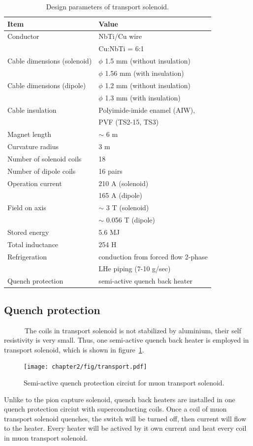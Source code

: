 \begin{table}[H]
 \centering
 \begin{tabular}{ll} \hline \hline
  Item & Value \\ \hline
  Conductor & NbTi/Cu wire \\
   & Cu:NbTi = 6:1 \\
  Cable dimensions (solenoid) & $\phi$ 1.5 mm (without insulation) \\
   & $\phi$ 1.56 mm (with insulation) \\
  Cable dimensions (dipole) & $\phi$ 1.2 mm (without insulation) \\
   & $\phi$ 1.3 mm (with insulation) \\
  Cable insulation & Polyimide-imide enamel (AIW), \\
   & PVF (TS2-15, TS3) \\
  Magnet length & $\sim$ 6 m \\
  Curvature radius & 3 m \\
  Number of solenoid coils & 18 \\
  Number of dipole coils & 16 pairs \\
  Operation current & 210 A (solenoid) \\
   & 165 A (dipole) \\
  Field on axis & $\sim$ 3 T (solenoid) \\
   & $\sim$ 0.056 T (dipole) \\
  Stored energy & 5.6 MJ \\
  Total inductance & 254 H \\
  Refrigeration & conduction from forced flow 2-phase \\
   & LHe piping (7-10 g/sec) \\
  Quench protection & semi-active quench back heater \\ \hline \hline
 \end{tabular}
 \caption{Design parameters of transport solenoid.}
 \label{designts}
\end{table}

\subsection{Quench protection}
~~~~~~The coils in transport solenoid is not stabilized by aluminium, their self resistivity is very small.
Thus, one semi-active quench back heater is employed in transport solenoid, which is shown in figure~\ref{transqu}.
\begin{figure}[H]
 \centering
 \texttt{[image: chapter2/fig/transport.pdf]}
 \caption{Semi-active quench protection circiut for muon transport solenoid.}
 \label{transqu}
\end{figure}
Unlike to the pion capture solenoid, quench back heaters are installed in one quench protection circiut with superconducting coils.
Once a coil of muon transport solenoid quenches, the switch will be turned off, then current will flow to the heater.
Every heater will be actived by it own current and heat every coil in muon transport solenoid.

